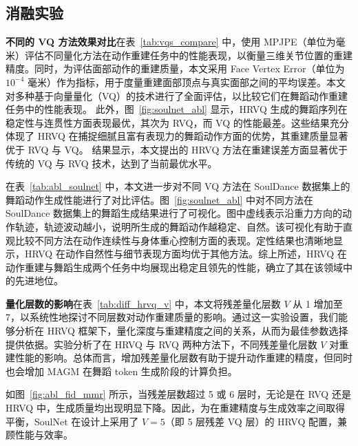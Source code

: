 \subsection{消融实验}
\textbf{不同的 VQ 方法效果对比}\quad  在表~\ref{tab:vqs_compare} 中，使用 MPJPE（单位为毫米）评估不同量化方法在动作重建任务中的性能表现，以衡量三维关节位置的重建精度。同时，为评估面部动作的重建质量，本文采用 Face Vertex Error（单位为 $10^{-4}$ 毫米）作为指标，用于度量重建面部顶点与真实面部之间的平均误差。本文对多种基于向量量化（VQ）的技术进行了全面评估，以比较它们在舞蹈动作重建任务中的性能表现。
此外，图~\ref{fig:soulnet_abl} 显示，HRVQ 生成的舞蹈序列在稳定性与连贯性方面表现最优，其次为 RVQ，而 VQ 的性能最差。这些结果充分体现了 HRVQ 在捕捉细腻且富有表现力的舞蹈动作方面的优势，其重建质量显著优于 RVQ 与 VQ。
结果显示，本文提出的 HRVQ 方法在重建误差方面显著优于传统的 VQ 与 RVQ 技术，达到了当前最优水平。



在表~\ref{tab:abl_soulnet} 中，本文进一步对不同 VQ 方法在 SoulDance 数据集上的舞蹈动作生成性能进行了对比评估。图~\ref{fig:soulnet_abl} 中对不同方法在 SoulDance 数据集上的舞蹈生成结果进行了可视化。图中虚线表示沿重力方向的动作轨迹，轨迹波动越小，说明所生成的舞蹈动作越稳定、自然。该可视化有助于直观比较不同方法在动作连续性与身体重心控制方面的表现。定性结果也清晰地显示，HRVQ 在动作自然性与细节表现方面均优于其他方法。综上所述，HRVQ 在动作重建与舞蹈生成两个任务中均展现出稳定且领先的性能，确立了其在该领域中的先进地位。


\textbf{量化层数的影响}\quad  在表~\ref{tab:diff_hrvq_v} 中，本文将残差量化层数 $V$ 从 1 增加至 7，以系统性地探讨不同层数对动作重建质量的影响。通过这一实验设置，我们能够分析在 HRVQ 框架下，量化深度与重建精度之间的关系，从而为最佳参数选择提供依据。实验分析了在 HRVQ 与 RVQ 两种方法下，不同残差量化层数 $V$ 对重建性能的影响。总体而言，增加残差量化层数有助于提升动作重建的精度，但同时也会增加 MAGM 在舞蹈 token 生成阶段的计算负担。

如图~\ref{fig:abl_fid_mmr} 所示，当残差层数超过 5 或 6 层时，无论是在 RVQ 还是 HRVQ 中，生成质量均出现明显下降。因此，为在重建精度与生成效率之间取得平衡，SoulNet 在设计上采用了 $V=5$（即 5 层残差 VQ 层）的 HRVQ 配置，兼顾性能与效率。

